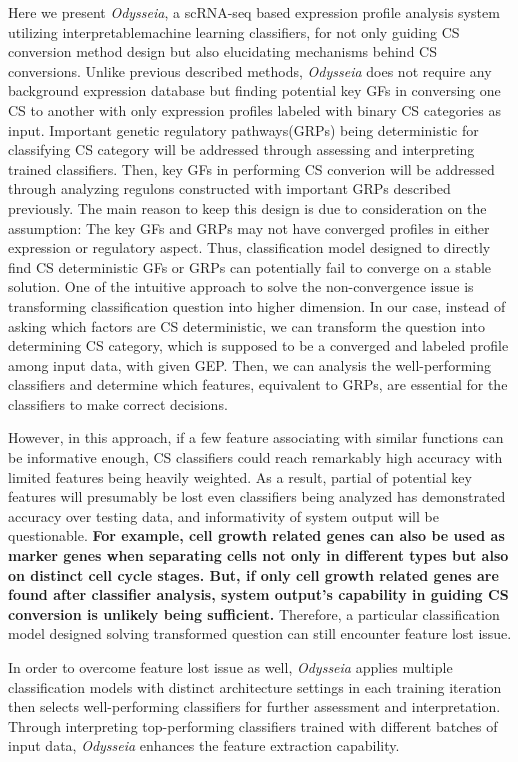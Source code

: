 \documentclass[fleqn,10pt]{wlscirep}
\begin{document}
Here we present \emph{Odysseia}, a scRNA-seq based expression profile analysis system utilizing interpretablemachine learning classifiers, for not only guiding CS conversion method design but also elucidating mechanisms behind CS conversions.
Unlike previous described methods, \emph{Odysseia} does not require any background expression database but finding potential key GFs in conversing one CS to another with only expression profiles labeled with binary CS categories as input.
Important genetic regulatory pathways(GRPs) being deterministic for classifying CS category will be addressed through assessing and interpreting trained classifiers.
Then, key GFs in performing CS converion will be addressed through analyzing regulons constructed with important GRPs described previously.
The main reason to keep this design is due to consideration on the assumption: The key GFs and GRPs may not have converged profiles in either expression or regulatory aspect.
Thus, classification model designed to directly find CS deterministic GFs or GRPs can potentially fail to converge on a stable solution.
One of the intuitive approach to solve the non-convergence issue is transforming classification question into higher dimension.
In our case, instead of asking which factors are CS deterministic, we can transform the question into determining CS category, which is supposed to be a converged and labeled profile among input data, with given GEP.
Then, we can analysis the well-performing classifiers and determine which features, equivalent to GRPs, are essential for the classifiers to make correct decisions.

However, in this approach, if a few feature associating with similar functions can be informative enough, CS classifiers could reach remarkably high accuracy with limited features being heavily weighted.
As a result, partial of potential key features will presumably be lost even classifiers being analyzed has demonstrated accuracy over testing data, and informativity of system output will be questionable.
\textbf{
For example, cell growth related genes can also be used as marker genes when separating cells not only in different types but also on distinct cell cycle stages.
But, if only cell growth related genes are found after classifier analysis, system output's capability in guiding CS conversion is unlikely being sufficient.
}
Therefore, a particular classification model designed solving transformed question can still encounter feature lost issue.

In order to overcome feature lost issue as well, \emph{Odysseia} applies multiple classification models with distinct architecture settings in each training iteration then selects well-performing classifiers for further assessment and interpretation.
Through interpreting top-performing classifiers trained with different batches of input data, \emph{Odysseia} enhances the feature extraction capability.
\end{document}
